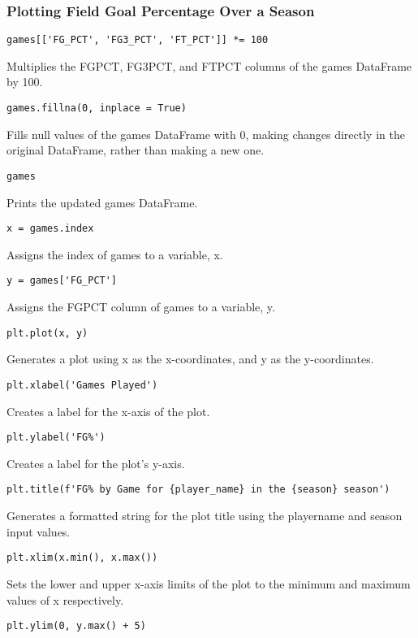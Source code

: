 \documentclass{article}
\begin{document}
\subsubsection{Plotting Field Goal Percentage Over a Season}

\begin{lstlisting}
games[['FG_PCT', 'FG3_PCT', 'FT_PCT']] *= 100
\end{lstlisting}
Multiplies the FG\textunderscore PCT, FG3\textunderscore PCT, and FT\textunderscore PCT columns of the games DataFrame by 100.
\begin{lstlisting}
games.fillna(0, inplace = True)
\end{lstlisting}
Fills null values of the games DataFrame with 0, making changes directly in the original DataFrame, rather than making a new one.
\begin{lstlisting}
games
\end{lstlisting}
Prints the updated games DataFrame.
\begin{lstlisting}
x = games.index
\end{lstlisting}
Assigns the index of games to a variable, x.
\begin{lstlisting}
y = games['FG_PCT']
\end{lstlisting}
Assigns the FG\textunderscore PCT column of games to a variable, y.
\begin{lstlisting}
plt.plot(x, y)
\end{lstlisting}
Generates a plot using x as the x-coordinates, and y as the y-coordinates.
\begin{lstlisting}
plt.xlabel('Games Played')
\end{lstlisting}
Creates a label for the x-axis of the plot.
\begin{lstlisting}
plt.ylabel('FG%')
\end{lstlisting}
Creates a label for the plot's y-axis.
\begin{lstlisting}
plt.title(f'FG% by Game for {player_name} in the {season} season')
\end{lstlisting}
Generates a formatted string for the plot title using the player\textunderscore name and season input values.
\begin{lstlisting}
plt.xlim(x.min(), x.max())
\end{lstlisting}
Sets the lower and upper x-axis limits of the plot to the minimum and maximum values of x respectively.
\begin{lstlisting}
plt.ylim(0, y.max() + 5)
\end{lstlisting}
\end{document}
